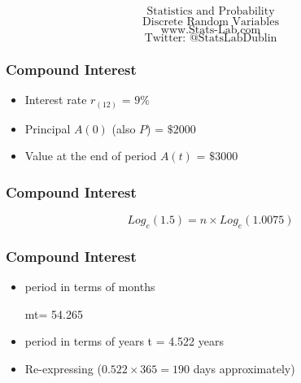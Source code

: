 \documentclass{beamer}
\begin{document}
\begin{frame}
\Huge
\[ \mbox{Statistics and Probability} \]
\LARGE
\[ \mbox{Discrete Random Variables} \]
\bigskip
\Large
\[ \mbox{www.Stats-Lab.com} \]
\[ \mbox{Twitter: @StatsLabDublin} \]
\bigskip

\end{frame}
\begin{frame}
\frametitle{Compound Interest}
\Large
\begin{itemize}
\item Interest rate $r_{(12)}$ = $9\%$
\item Principal $A(0)$ (also $P$) = $\$2000$
\item Value at the end of period $A(t)$ = $\$3000$
\end{itemize}
\end{frame}

\begin{frame}
\frametitle{Compound Interest}
\vspace{-2cm}
\Large
\[ Log_e(1.5) = n\times Log_e(1.0075)\]
\end{frame}


\begin{frame}
\frametitle{Compound Interest}
\vspace{-2cm}
\Large
\begin{itemize}
\item period in terms of months

mt= 54.265

\item period in terms of years
t = 4.522 years

\item Re-expressing
($0.522 \times 365 = 190$ days approximately)
\end{itemize}
\end{frame}
\end{document}
